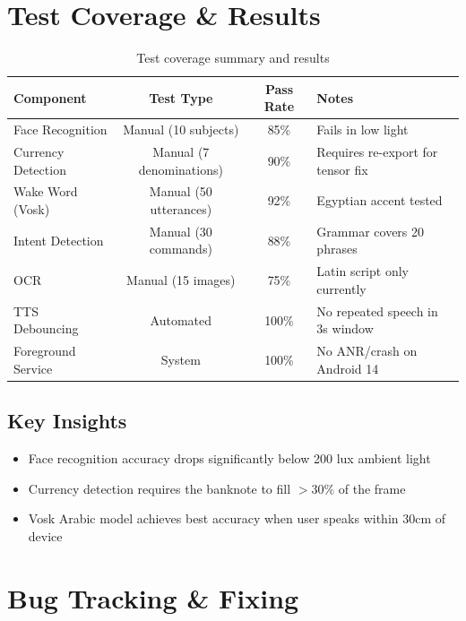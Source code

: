 \documentclass[12pt,a4paper]{article}
\begin{document}
\section{Test Coverage \& Results}

\begin{table}[h]
\centering
\begin{tabular}{lccl}
\toprule
\textbf{Component} & \textbf{Test Type} & \textbf{Pass Rate} & \textbf{Notes} \\
\midrule
Face Recognition & Manual (10 subjects) & 85\% & Fails in low light \\
Currency Detection & Manual (7 denominations) & 90\% & Requires re-export for tensor fix \\
Wake Word (Vosk) & Manual (50 utterances) & 92\% & Egyptian accent tested \\
Intent Detection & Manual (30 commands) & 88\% & Grammar covers 20 phrases \\
OCR & Manual (15 images) & 75\% & Latin script only currently \\
TTS Debouncing & Automated & 100\% & No repeated speech in 3s window \\
Foreground Service & System & 100\% & No ANR/crash on Android 14 \\
\bottomrule
\end{tabular}
\caption{Test coverage summary and results}
\end{table}

\subsection{Key Insights}
\begin{itemize}
  \item Face recognition accuracy drops significantly below 200 lux ambient light
  \item Currency detection requires the banknote to fill $>30\%$ of the frame
  \item Vosk Arabic model achieves best accuracy when user speaks within 30cm of device
\end{itemize}

\section{Bug Tracking \& Fixing}
\end{document}

